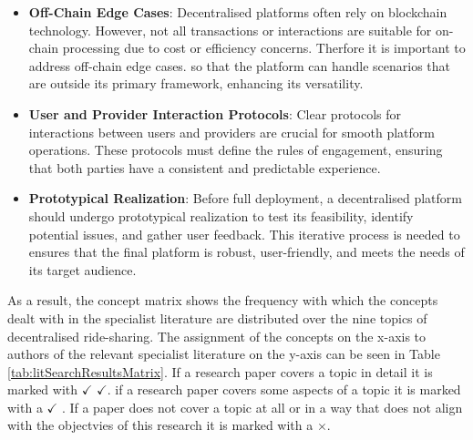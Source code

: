 \begin{itemize}
    \item \textbf{Off-Chain Edge Cases}: Decentralised platforms often rely on blockchain technology. However, not all transactions or interactions are suitable for on-chain processing due to cost or efficiency concerns. Therfore it is important to address off-chain edge cases. so that the platform can handle scenarios that are outside its primary framework, enhancing its versatility.
    
    \item \textbf{User and Provider Interaction Protocols}: Clear protocols for interactions between users and providers are crucial for smooth platform operations. These protocols must define the rules of engagement, ensuring that both parties have a consistent and predictable experience. 
    
    \item \textbf{Prototypical Realization}: Before full deployment, a decentralised platform should undergo prototypical realization to test its feasibility, identify potential issues, and gather user feedback. This iterative process is needed to ensures that the final platform is robust, user-friendly, and meets the needs of its target audience.
\end{itemize}


As a result, the concept matrix shows the frequency with which the concepts dealt with in the specialist literature are distributed over the nine topics of decentralised ride-sharing. The assignment of the concepts on the x-axis to authors of the relevant specialist literature on the y-axis can be seen in Table \ref{tab:litSearchResultsMatrix}. If a research paper covers a topic in detail it is marked with $\checkmark$ $\checkmark$. if a research paper covers some aspects of a topic it is marked with a $\checkmark$ . If a paper does not cover a topic at all or in a way that does not align with the objectvies of this research it is marked with a $\times$. 


